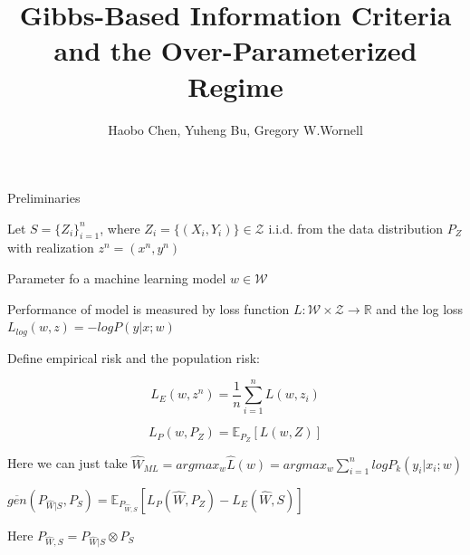 \documentclass{beamer}
\title[Deep Reference Priors]{Gibbs-Based Information Criteria and the
Over-Parameterized Regime}
\author[Y. Gao et al.]{Haobo Chen, Yuheng Bu, Gregory W.Wornell}
\date{\footnotesize

\par\bigskip\small Presented by: Papay Ivan}
\begin{document}
\begin{frame}
\thispagestyle{empty}
\maketitle
\end{frame}

\begin{frame}{Preliminaries}

Let $S=\{Z_i\}_{i=1}^n$, where $Z_i=\{(X_i,Y_i)\} \in \mathcal{Z}$ i.i.d. from the data distribution $P_Z$ with realization $z^n=(x^n,y^n)$

Parameter fo a machine learning model $w \in \mathcal{W}$

Performance of model is measured by loss function $L: \mathcal{W} \times \mathcal{Z} \rightarrow \mathbb{R}$ and the log loss $L_{log}(w,z)=-log P(y|x;w)$

Define empirical risk and the population risk:

\[
L_E(w,z^n)=\frac{1}{n} \sum_{i=1}^n L(w,z_i)
\]

\[
L_P(w,P_Z)=\mathbb{E}_{P_Z}[L(w,Z)]
\]

Here we can just take $\hat{W}_{ML} = argmax_w \hat{L}(w)=argmax_w \sum_{i=1}^n log P_k(y_i|x_i;w)$

$\overline{gen}(P_{\hat{W}|S},P_S)=\mathbb{E}_{P_{\hat{W},S}} [L_P (\hat{W}, P_Z)-L_E(\hat{W}, S)]$

Here $P_{\hat{W},S} = P_{\hat{W}|S} \otimes P_S$

\end{frame}
\end{document}
